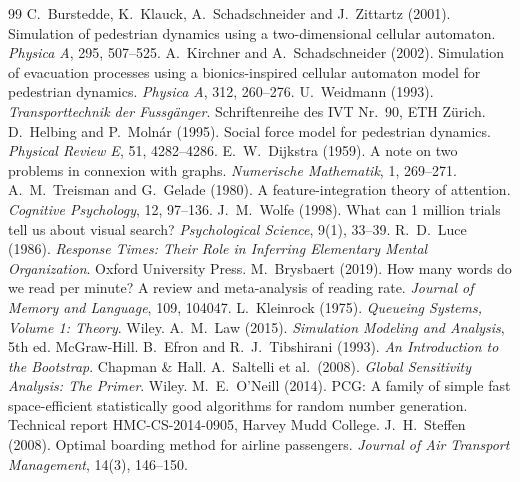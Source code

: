 \documentclass[11pt,a4paper]{article}
\begin{document}
\begin{thebibliography}{99}\small
{} C.~Burstedde, K.~Klauck, A.~Schadschneider and J.~Zittartz (2001). Simulation of pedestrian dynamics using a two-dimensional cellular automaton. \emph{Physica A}, 295, 507--525.
 A.~Kirchner and A.~Schadschneider (2002). Simulation of evacuation processes using a bionics-inspired cellular automaton model for pedestrian dynamics. \emph{Physica A}, 312, 260--276.
 U.~Weidmann (1993). \emph{Transporttechnik der Fussg\"anger}. Schriftenreihe des IVT Nr.~90, ETH Z\"urich.
 D.~Helbing and P.~Moln\'ar (1995). Social force model for pedestrian dynamics. \emph{Physical Review E}, 51, 4282--4286.
 E.~W.~Dijkstra (1959). A note on two problems in connexion with graphs. \emph{Numerische Mathematik}, 1, 269--271.
 A.~M.~Treisman and G.~Gelade (1980). A feature-integration theory of attention. \emph{Cognitive Psychology}, 12, 97--136.
 J.~M.~Wolfe (1998). What can 1 million trials tell us about visual search? \emph{Psychological Science}, 9(1), 33--39.
 R.~D.~Luce (1986). \emph{Response Times: Their Role in Inferring Elementary Mental Organization}. Oxford University Press.
 M.~Brysbaert (2019). How many words do we read per minute? A review and meta-analysis of reading rate. \emph{Journal of Memory and Language}, 109, 104047.
 L.~Kleinrock (1975). \emph{Queueing Systems, Volume 1: Theory}. Wiley.
 A.~M.~Law (2015). \emph{Simulation Modeling and Analysis}, 5th ed. McGraw-Hill.
 B.~Efron and R.~J.~Tibshirani (1993). \emph{An Introduction to the Bootstrap}. Chapman \& Hall.
 A.~Saltelli et al.\ (2008). \emph{Global Sensitivity Analysis: The Primer}. Wiley.
 M.~E.~O'Neill (2014). PCG: A family of simple fast space-efficient statistically good algorithms for random number generation. Technical report HMC-CS-2014-0905, Harvey Mudd College.
 J.~H.~Steffen (2008). Optimal boarding method for airline passengers. \emph{Journal of Air Transport Management}, 14(3), 146--150.
\end{thebibliography}
\end{document}
